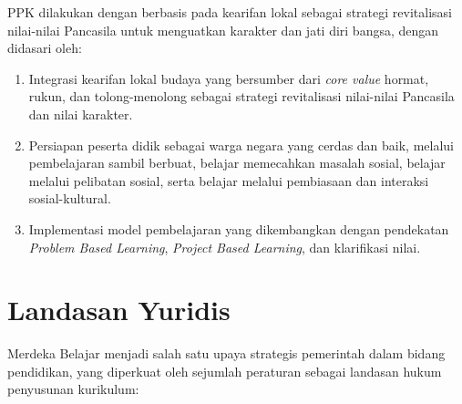 PPK dilakukan dengan berbasis pada kearifan lokal sebagai strategi revitalisasi nilai-nilai Pancasila untuk menguatkan karakter dan jati diri bangsa, dengan didasari oleh:
\begin{enumerate}
\item Integrasi kearifan lokal budaya yang bersumber dari \emph{\foreignlanguage{english}{core value}} hormat, rukun, dan tolong-menolong sebagai strategi revitalisasi nilai-nilai Pancasila dan nilai karakter.
\item Persiapan peserta didik sebagai warga negara yang cerdas dan baik, melalui pembelajaran sambil berbuat, belajar memecahkan masalah sosial, belajar melalui pelibatan sosial, serta belajar melalui pembiasaan dan interaksi sosial-kultural.
\item Implementasi model pembelajaran yang dikembangkan dengan pendekatan \emph{Problem Based Learning}, \emph{Project Based Learning}, dan klarifikasi nilai.
\end{enumerate}

\section{Landasan Yuridis}

Merdeka Belajar menjadi salah satu upaya strategis pemerintah dalam bidang pendidikan, yang diperkuat oleh sejumlah peraturan sebagai landasan hukum penyusunan kurikulum:

